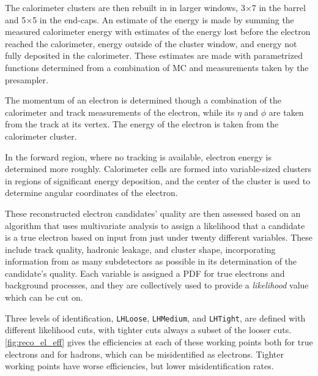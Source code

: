 The calorimeter clusters are then rebuilt in in larger windows, 3$\times$7 in the barrel and 5$\times$5 in the end-caps. An estimate of the energy is made by summing the measured calorimeter energy with estimates of the energy lost before the electron reached the calorimeter, energy outside of the cluster window, and energy not fully deposited in the calorimeter. These estimates are made with parametrized functions determined from a combination of \ac{MC} and measurements taken by the presampler. 

The momentum of an electron is determined though a combination of the calorimeter and track measurements of the electron, while its $\eta$ and $\phi$ are taken from the track at its vertex. The energy of the electron is taken from the calorimeter cluster.

In the forward region, where no tracking is available, electron energy is determined more roughly. Calorimeter cells are formed into variable-sized clusters in regions of significant energy deposition, and the center of the cluster is used to determine angular coordinates of the electron. 

These reconstructed electron candidates' quality are then assessed based on an algorithm that uses multivariate analysis to assign a likelihood that a candidate is a true electron based on input from just under twenty different variables. These include track quality, hadronic leakage, and cluster shape, incorporating information from as many subdetectors as possible in its determination of the candidate's quality. Each variable is assigned a \acf{PDF} for true electrons and background processes, and they are collectively used to provide a \textit{likelihood} value which can be cut on. 

Three levels of identification, \texttt{LHLoose}, \texttt{LHMedium}, and \texttt{LHTight}, are defined with different likelihood cuts, with tighter cuts always a subset of the looser cuts. \autoref{fig:reco_el_eff} gives the efficiencies at each of these working points both for true electrons and for hadrons, which can be misidentified as electrons. Tighter working points have worse efficiencies, but lower misidentification rates. 

